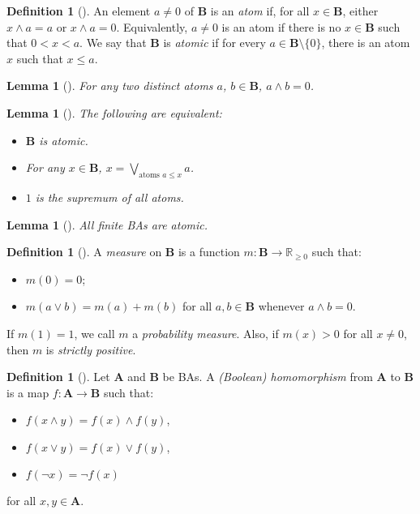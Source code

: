 \documentclass{article}
\newtheorem{lemma}[theorem]{Lemma}
\theoremstyle{definition}
\newtheorem{definition}[theorem]{Definition}
\theoremstyle{remark}
\begin{document}
\begin{definition}[\cite{DBLP:books/daglib/0090259,levasseur2012applied}]
  An element $a \ne 0$ of $\mathbf{B}$ is an \emph{atom} if, for all $x \in
  \mathbf{B}$, either $x \land a = a$ or $x \land a = 0$. Equivalently, $a \ne
  0$ is an atom if there is no $x \in \mathbf{B}$ such that $0 < x < a$. We say
  that $\mathbf{B}$ is \emph{atomic} if for every $a \in \mathbf{B} \setminus \{0
  \}$, there is an atom $x$ such that $x \le a$.
\end{definition}

\begin{lemma}[\cite{ganesh2006introduction}]
  For any two distinct atoms $a$, $b \in \mathbf{B}$, $a \land b = 0$.
\end{lemma}

\begin{lemma}[\cite{givant2008introduction}] \label{thm:representation}
  The following are equivalent:
  \begin{itemize}
  \item $\mathbf{B}$ is atomic.
  \item For any $x \in \mathbf{B}$, $x = \bigvee_{\text{atoms } a \le x} a$.
  \item $1$ is the supremum of all atoms.
  \end{itemize}
\end{lemma}

\begin{lemma}[\cite{givant2008introduction}] \label{lemma:atomic}
  All finite BAs are atomic.
\end{lemma}

\begin{definition}[\cite{gaifman1964concerning,DBLP:books/daglib/0090259}] \label{def:measure}
  A \emph{measure} on $\mathbf{B}$ is a function $m\colon
  \mathbf{B} \to \mathbb{R}_{\ge 0}$ such that:
  \begin{itemize}
  \item $m(0) = 0$;
  \item $m(a \lor b) = m(a) + m(b)$ for all $a, b \in \mathbf{B}$ whenever $a
    \land b = 0$.
  \end{itemize}
  If $m(1) = 1$, we call $m$ a \emph{probability measure}. Also, if $m(x) > 0$
  for all $x \ne 0$, then $m$ is \emph{strictly positive}.
\end{definition}

\begin{definition}[\cite{givant2008introduction}]
  Let $\mathbf{A}$ and $\mathbf{B}$ be BAs. A \emph{(Boolean) homomorphism} from
  $\mathbf{A}$ to $\mathbf{B}$ is a map $f\colon \mathbf{A} \to \mathbf{B}$ such
  that:
  \begin{itemize}
  \item $f(x \land y) = f(x) \land f(y)$,
  \item $f(x \lor y) = f(x) \lor f(y)$,
  \item $f(\neg x) = \neg f(x)$
  \end{itemize}
  for all $x, y \in \mathbf{A}$.
\end{definition}
\end{document}
